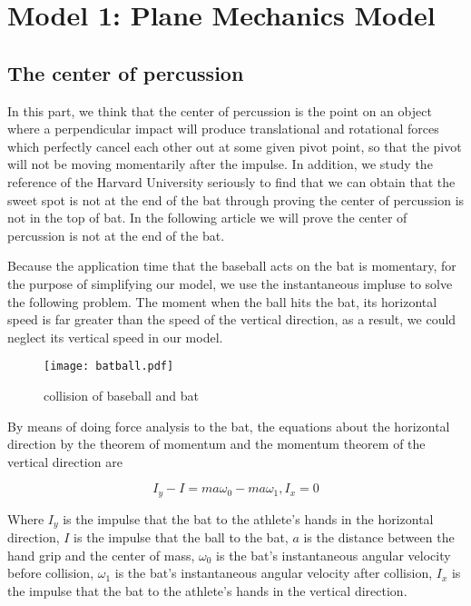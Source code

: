 \section{Model 1: Plane Mechanics Model}

\subsection{The center of percussion}

In this part, we think that the center of percussion is the point on an object where a perpendicular impact will produce translational and rotational forces which perfectly cancel each other out at some given pivot point, so that the pivot will not be moving momentarily after the impulse. In addition, we study the reference of the Harvard University \cite{Percussion} seriously to find that we can obtain that the sweet spot is not at the end of the bat through proving the center of percussion is not in the top of bat. In the following article we will prove the center of percussion is not at the end of the bat.

Because the application time that the baseball acts on the bat is momentary, for the purpose of simplifying our model, we use the instantaneous impluse to solve the following problem. The moment when the ball hits the bat, its horizontal speed is far greater than the speed of the vertical direction, as a result, we could neglect its vertical speed in our model.

\begin{figure}[!htb]
\centering
\texttt{[image: batball.pdf]}
\caption{\label{CollisionOfBaseballAndBat}collision of baseball and bat}
\end{figure}

By means of doing force analysis to the bat, the equations about the horizontal direction by the theorem of momentum and the momentum theorem of the vertical direction are

\begin{equation}
I_y-I=ma\omega_0-ma\omega_1, I_x=0
\end{equation}

Where
$I_y$ is the impulse that the bat to the athlete's hands in the horizontal direction,
  $I$ is the impulse that the ball to the bat,
  $a$ is the distance between the hand grip and the center of mass,
  $\omega_0$ is the bat's instantaneous angular velocity before collision,
  $\omega_1$ is the bat's instantaneous angular velocity after collision,
  $I_x$ is the impulse that the bat to the athlete's hands in the vertical direction.

